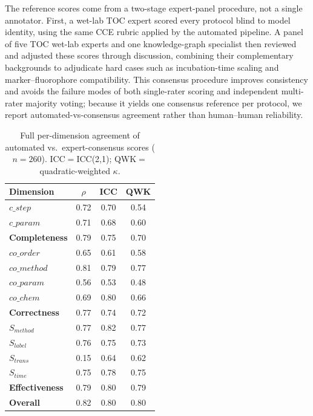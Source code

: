 \documentclass[conference]{IEEEtran}
\begin{document}
The reference scores come from a two-stage expert-panel procedure, not a single
annotator. First, a wet-lab TOC expert scored every protocol blind to model
identity, using the same CCE rubric applied by the automated pipeline. A panel of
five TOC wet-lab experts and one knowledge-graph specialist then reviewed and
adjusted these scores through discussion, combining their complementary
backgrounds to adjudicate hard cases such as incubation-time scaling and
marker--fluorophore compatibility. This consensus procedure improves consistency
and avoids the failure modes of both single-rater scoring and independent
multi-rater majority voting; because it yields one consensus reference per
protocol, we report automated-vs-consensus agreement rather than human--human
reliability.

\begin{table}[htbp]
    \centering
    \caption{Full per-dimension agreement of automated vs.\ expert-consensus
    scores ($n{=}260$). ICC${=}$ICC(2,1); QWK${=}$quadratic-weighted $\kappa$.}
    \label{tab:calibfull}
    \small
    \begin{tabular}{l c c c}
        \toprule
        \textbf{Dimension} & $\rho$ & \textbf{ICC} & \textbf{QWK} \\
        \midrule
        $c\_step$  & 0.72 & 0.70 & 0.54 \\
        $c\_param$ & 0.71 & 0.68 & 0.60 \\
        \textbf{Completeness} & 0.79 & 0.75 & 0.70 \\
        \midrule
        $co\_order$  & 0.65 & 0.61 & 0.58 \\
        $co\_method$ & 0.81 & 0.79 & 0.77 \\
        $co\_param$  & 0.56 & 0.53 & 0.48 \\
        $co\_chem$   & 0.69 & 0.80 & 0.66 \\
        \textbf{Correctness} & 0.77 & 0.74 & 0.72 \\
        \midrule
        $S_{method}$ & 0.77 & 0.82 & 0.77 \\
        $S_{label}$  & 0.76 & 0.75 & 0.73 \\
        $S_{trans}$  & 0.15 & 0.64 & 0.62 \\
        $S_{time}$   & 0.75 & 0.78 & 0.75 \\
        \textbf{Effectiveness} & 0.79 & 0.80 & 0.79 \\
        \midrule
        \textbf{Overall} & 0.82 & 0.80 & 0.80 \\
        \bottomrule
    \end{tabular}
\end{table}
\end{document}
